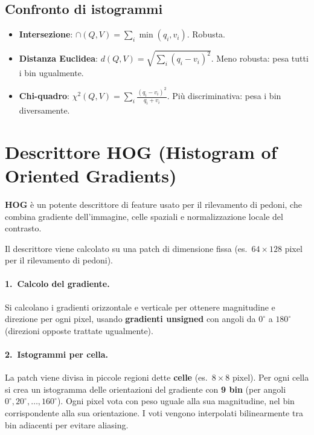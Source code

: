 \documentclass[12pt, a4paper]{report}
\begin{document}
\subsection{Confronto di istogrammi}

\begin{itemize}
  \item \textbf{Intersezione}: $\cap(Q,V)=\sum_i \min(q_i,v_i)$. Robusta.
  \item \textbf{Distanza Euclidea}: $d(Q,V)=\sqrt{\sum_i(q_i-v_i)^2}$.
        Meno robusta: pesa tutti i bin ugualmente.
  \item \textbf{Chi-quadro}: $\chi^2(Q,V)=\sum_i\frac{(q_i-v_i)^2}{q_i+v_i}$.
        Più discriminativa: pesa i bin diversamente.
\end{itemize}

\section{Descrittore HOG (Histogram of Oriented Gradients)}

\begin{defbox}[HOG]
\textbf{HOG} è un potente descrittore di feature usato per il rilevamento di
pedoni, che combina gradiente dell'immagine, celle spaziali e normalizzazione
locale del contrasto.
\end{defbox}

Il descrittore viene calcolato su una patch di dimensione fissa
(es.\ $64\times128$ pixel per il rilevamento di pedoni).

\paragraph{1.\ Calcolo del gradiente.}
Si calcolano i gradienti orizzontale e verticale per ottenere magnitudine e
direzione per ogni pixel, usando \textbf{gradienti unsigned} con angoli da $0^{\circ}$
a $180^{\circ}$ (direzioni opposte trattate ugualmente).

\paragraph{2.\ Istogrammi per cella.}
La patch viene divisa in piccole regioni dette \textbf{celle} (es.\ $8\times8$
pixel). Per ogni cella si crea un istogramma delle orientazioni del gradiente
con \textbf{9 bin} (per angoli $0^{\circ}, 20^{\circ}, \ldots, 160^{\circ}$). Ogni pixel vota con
peso uguale alla sua magnitudine, nel bin corrispondente alla sua orientazione.
I voti vengono interpolati bilinearmente tra bin adiacenti per evitare aliasing.
\end{document}
